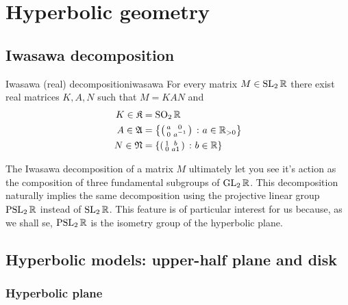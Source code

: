 
\chapter{Hyperbolic geometry} %

\label{Chapter1} %
\thispagestyle{empty}

\section{Iwasawa decomposition}

\begin{impTeo}{Iwasawa (real) decomposition}{iwasawa}
For every matrix $M\in\operatorname{SL}_{2}\mathbb{R}$ there exist real matrices $K,A,N$ such that $M=KAN$ and 
\begin{align*}
K\in\mathfrak{K}&=\operatorname{SO}_{2}\mathbb{R}\\
A\in\mathfrak{A}&=\left\{
\left(\begin{smallmatrix} a&0\\0&a^{-1} \end{smallmatrix}\right)\,\colon a\in\mathbb{R}_{>0}
\right\}\\
N\in\mathfrak{N}&=\left\{
\left(\begin{smallmatrix} 1&b\\0&a1 \end{smallmatrix}\right)\,\colon b\in\mathbb{R}
\right\}
\end{align*}
\end{impTeo}

The Iwasawa decomposition of a matrix $M$ ultimately let you see it's action as the composition of three fundamental subgroups of $\operatorname{GL}_{2}\mathbb{R}$. This decomposition naturally implies the same decomposition using the projective linear group $\operatorname{PSL}_{2}\mathbb{R}$ instead of $\operatorname{SL}_{2}\mathbb{R}$. This feature is of particular interest for us because, as we shall se, $\operatorname{PSL}_{2}\mathbb{R}$ is the isometry group of the hyperbolic plane.


\section{Hyperbolic models: upper-half plane and disk}

\label{sec:hyp_plane}
\subsection{Hyperbolic plane}

